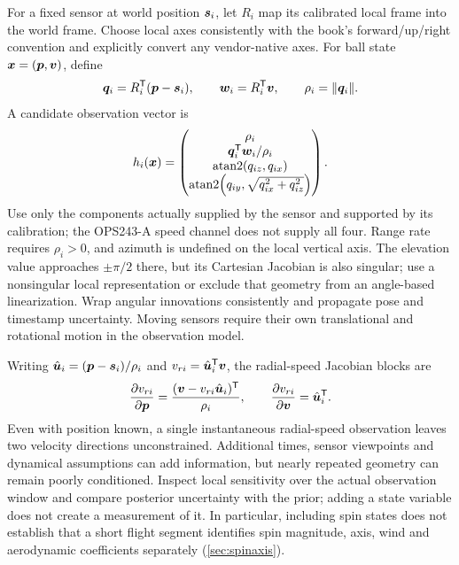 For a fixed sensor at world position $\bm{s}_i$, let $R_i$ map its calibrated local frame into the world frame.
Choose local axes consistently with the book's forward/up/right convention and explicitly convert any vendor-native axes.
For ball state $\bm{x}=(\bm{p},\bm{v})$, define
\begin{equation}
\bm{q}_i=R_i^{\mathsf T}(\bm{p}-\bm{s}_i),\qquad
\bm{w}_i=R_i^{\mathsf T}\bm{v},\qquad \rho_i=\lVert\bm{q}_i\rVert.
\label{eq:implsensorframe}
\end{equation}
A candidate observation vector is
\begin{equation}
\label{eq:implmeasurements}
h_i(\bm{x})=\begin{pmatrix}
\rho_i\\
\bm{q}_i^{\mathsf T}\bm{w}_i/\rho_i\\
\operatorname{atan2}(q_{iz},q_{ix})\\
\operatorname{atan2}\!\left(q_{iy},\sqrt{q_{ix}^2+q_{iz}^2}\right)
\end{pmatrix}.
\end{equation}
Use only the components actually supplied by the sensor and supported by its calibration; the OPS243-A speed channel does not supply all four.
Range rate requires $\rho_i>0$, and azimuth is undefined on the local vertical axis.
The elevation value approaches $\pm\pi/2$ there, but its Cartesian Jacobian is also singular; use a nonsingular local representation or exclude that geometry from an angle-based linearization.
Wrap angular innovations consistently and propagate pose and timestamp uncertainty.
Moving sensors require their own translational and rotational motion in the observation model.

Writing $\hat{\bm{u}}_i=(\bm{p}-\bm{s}_i)/\rho_i$ and $v_{ri}=\hat{\bm{u}}_i^{\mathsf T}\bm{v}$, the radial-speed Jacobian blocks are
\begin{equation}
\frac{\partial v_{ri}}{\partial\bm{p}}
=\frac{(\bm{v}-v_{ri}\hat{\bm{u}}_i)^{\mathsf T}}{\rho_i},
\qquad
\frac{\partial v_{ri}}{\partial\bm{v}}=\hat{\bm{u}}_i^{\mathsf T}.
\label{eq:implradialjacobian}
\end{equation}
Even with position known, a single instantaneous radial-speed observation leaves two velocity directions unconstrained.
Additional times, sensor viewpoints and dynamical assumptions can add information, but nearly repeated geometry can remain poorly conditioned.
Inspect local sensitivity over the actual observation window and compare posterior uncertainty with the prior; adding a state variable does not create a measurement of it.
In particular, including spin states does not establish that a short flight segment identifies spin magnitude, axis, wind and aerodynamic coefficients separately (\cref{sec:spinaxis}).

